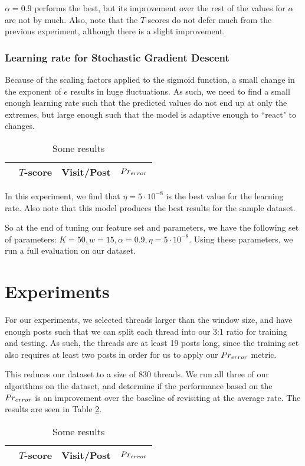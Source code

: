 $\alpha=0.9$ performs the best, but its improvement over the rest of the values 
for $\alpha$ are not by much. Also, note that the $T$-scores do not defer much 
from the previous experiment, although there is a slight improvement.

\subsubsection{Learning rate for Stochastic Gradient Descent}

Because of the scaling factors applied to the sigmoid function, a small change 
in the exponent of $e$ results in huge fluctuations. As such, we need to find a 
small enough learning rate such that the predicted values do not end up at only 
the extremes, but large enough such that the model is adaptive enough to 
``react" to changes.

\begin{table}
	\footnotesize
\begin{center}
\begin{tabular}{| l | c | c | c |}
\hline
& $T$-score			   &	Visit/Post & 	$Pr_{error}$\\
\hline
	
\hline
\end{tabular}
\end{center}
\caption{Some results}\label{tbl:par_tune_learning}
\end{table}

In this experiment, we find that $\eta=5\cdot10^{-8}$ is the best value for the 
learning rate. Also note that this model produces the best results for the 
sample dataset.


So at the end of tuning our feature set and parameters, we have the following 
set of parameters: $K = 50, w = 15, \alpha = 0.9, \eta = 5\cdot10^{-8}$. Using 
these parameters, we run a full evaluation on our dataset.

\section{Experiments}
For our experiments, we selected threads larger than the window size, and have 
enough posts such that we can split each thread into our 3:1 ratio for training 
and testing. As such, the threads are at least 19 posts long, since the training 
set also requires at least two posts in order for us to apply our $Pr_{error}$ 
metric.

This reduces our dataset to a size of 830 threads. We run all three of our 
algorithms on the dataset, and determine if the performance based on the 
$Pr_{error}$ is an improvement over the baseline of revisiting at the average 
rate. The results are seen in Table \ref{tbl:full_eval}.
\begin{table}
	\footnotesize
\begin{center}
\begin{tabular}{| l | c | c | c |}
\hline
& $T$-score			   &	Visit/Post & 	$Pr_{error}$\\
\hline
	
\hline
\end{tabular}
\end{center}
\caption{Some results}\label{tbl:full_eval}
\end{table}

